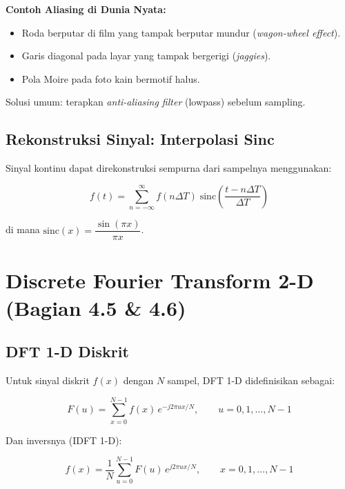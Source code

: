 \documentclass[12pt,a4paper]{article}
\begin{document}
\begin{tipbox}
\textbf{Contoh Aliasing di Dunia Nyata:}
\begin{itemize}
  \item Roda berputar di film yang tampak berputar mundur (\textit{wagon-wheel effect}).
  \item Garis diagonal pada layar yang tampak bergerigi (\textit{jaggies}).
  \item Pola Moire pada foto kain bermotif halus.
\end{itemize}
Solusi umum: terapkan \textit{anti-aliasing filter} (lowpass) sebelum sampling.
\end{tipbox}

\subsection{Rekonstruksi Sinyal: Interpolasi Sinc}

Sinyal kontinu dapat direkonstruksi sempurna dari sampelnya menggunakan:

\begin{equation}
  f(t) = \sum_{n=-\infty}^{\infty} f(n\Delta T)\;
         \mathrm{sinc}\!\left(\frac{t - n\Delta T}{\Delta T}\right)
  \label{eq:reconstruction}
\end{equation}

di mana $\mathrm{sinc}(x) = \dfrac{\sin(\pi x)}{\pi x}$.

\section{Discrete Fourier Transform 2-D (Bagian 4.5 \& 4.6)}

\subsection{DFT 1-D Diskrit}

Untuk sinyal diskrit $f(x)$ dengan $N$ sampel, DFT 1-D didefinisikan sebagai:

\begin{equation}
  F(u) = \sum_{x=0}^{N-1} f(x)\, e^{-j2\pi ux/N},
  \qquad u = 0, 1, \ldots, N-1
  \label{eq:dft_1d}
\end{equation}

Dan inversnya (IDFT 1-D):

\begin{equation}
  f(x) = \frac{1}{N} \sum_{u=0}^{N-1} F(u)\, e^{j2\pi ux/N},
  \qquad x = 0, 1, \ldots, N-1
  \label{eq:idft_1d}
\end{equation}
\end{document}
